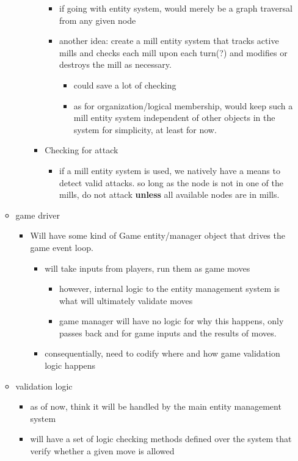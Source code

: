 \documentclass[11pt]{article}
\begin{document}
\begin{itemize}
\begin{itemize}
\begin{itemize}
\begin{itemize}
\begin{itemize}
\item if going with entity system, would merely be a graph traversal from any given node
\item another idea: create a mill entity system that tracks active mills and checks each
mill upon each turn(?) and modifies or destroys the mill as necessary.
\begin{itemize}
\item could save a lot of checking
\item as for organization/logical membership, would keep such a mill entity system
independent of other objects in the system for simplicity, at least for now.
\end{itemize}
\end{itemize}
\item Checking for attack
\begin{itemize}
\item if a mill entity system is used, we natively have a means to detect valid attacks. so
long as the node is not in one of the mills, do not attack \textbf{unless} all available
nodes are in mills.
\end{itemize}
\end{itemize}
\end{itemize}
\item game driver
\begin{itemize}
\item Will have some kind of Game entity/manager object that drives the game event loop.
\begin{itemize}
\item will take inputs from players, run them as game moves
\begin{itemize}
\item however, internal logic to the entity management system is what will ultimately validate moves
\item game manager will have no logic for why this happens, only passes back and for game
inputs and the results of moves.
\end{itemize}
\item consequentially, need to codify where and how game validation logic happens
\end{itemize}
\end{itemize}
\item validation logic
\begin{itemize}
\item as of now, think it will be handled by the main entity management system
\item will have a set of logic checking methods defined over the system that verify whether a
given move is allowed
\end{itemize}
\end{itemize}
\end{itemize}
\end{document}
